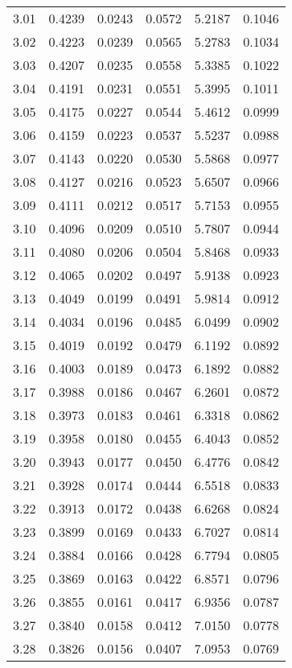 \documentclass{article}
\begin{document}
\begin{longtable}{cccccc}
3.01 & 0.4239 & 0.0243 & 0.0572 & 5.2187 & 0.1046 \\
3.02 & 0.4223 & 0.0239 & 0.0565 & 5.2783 & 0.1034 \\
3.03 & 0.4207 & 0.0235 & 0.0558 & 5.3385 & 0.1022 \\
3.04 & 0.4191 & 0.0231 & 0.0551 & 5.3995 & 0.1011 \\
3.05 & 0.4175 & 0.0227 & 0.0544 & 5.4612 & 0.0999 \\
3.06 & 0.4159 & 0.0223 & 0.0537 & 5.5237 & 0.0988 \\
3.07 & 0.4143 & 0.0220 & 0.0530 & 5.5868 & 0.0977 \\
3.08 & 0.4127 & 0.0216 & 0.0523 & 5.6507 & 0.0966 \\
3.09 & 0.4111 & 0.0212 & 0.0517 & 5.7153 & 0.0955 \\
3.10 & 0.4096 & 0.0209 & 0.0510 & 5.7807 & 0.0944 \\
3.11 & 0.4080 & 0.0206 & 0.0504 & 5.8468 & 0.0933 \\
3.12 & 0.4065 & 0.0202 & 0.0497 & 5.9138 & 0.0923 \\
3.13 & 0.4049 & 0.0199 & 0.0491 & 5.9814 & 0.0912 \\
3.14 & 0.4034 & 0.0196 & 0.0485 & 6.0499 & 0.0902 \\
3.15 & 0.4019 & 0.0192 & 0.0479 & 6.1192 & 0.0892 \\
3.16 & 0.4003 & 0.0189 & 0.0473 & 6.1892 & 0.0882 \\
3.17 & 0.3988 & 0.0186 & 0.0467 & 6.2601 & 0.0872 \\
3.18 & 0.3973 & 0.0183 & 0.0461 & 6.3318 & 0.0862 \\
3.19 & 0.3958 & 0.0180 & 0.0455 & 6.4043 & 0.0852 \\
3.20 & 0.3943 & 0.0177 & 0.0450 & 6.4776 & 0.0842 \\
3.21 & 0.3928 & 0.0174 & 0.0444 & 6.5518 & 0.0833 \\
3.22 & 0.3913 & 0.0172 & 0.0438 & 6.6268 & 0.0824 \\
3.23 & 0.3899 & 0.0169 & 0.0433 & 6.7027 & 0.0814 \\
3.24 & 0.3884 & 0.0166 & 0.0428 & 6.7794 & 0.0805 \\
3.25 & 0.3869 & 0.0163 & 0.0422 & 6.8571 & 0.0796 \\
3.26 & 0.3855 & 0.0161 & 0.0417 & 6.9356 & 0.0787 \\
3.27 & 0.3840 & 0.0158 & 0.0412 & 7.0150 & 0.0778 \\
3.28 & 0.3826 & 0.0156 & 0.0407 & 7.0953 & 0.0769 \\

\end{longtable}
\end{document}

